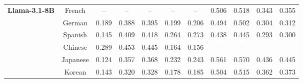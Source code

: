 \begin{table}[t]
\begin{tabular}{lcccccccccc}
    \midrule
    \multirow[c]{6}{*}{\textbf{Llama-3.1-8B}} & French   & --    & --    & --    & --    & --    & 0.506 & 0.518 & 0.343 & 0.355 \\
     & German   & 0.189 & 0.388 & 0.395 & 0.199 & 0.206 & 0.494 & 0.502 & 0.304 & 0.312 \\
     & Spanish  & 0.145 & 0.409 & 0.418 & 0.264 & 0.273 & 0.438 & 0.445 & 0.293 & 0.300 \\
     & \cellcolor{lightblue}Chinese & \cellcolor{lightblue}0.289 & \cellcolor{lightblue}0.453 & \cellcolor{lightblue}0.445 & \cellcolor{lightblue}0.164 & \cellcolor{lightblue}0.156 & \cellcolor{lightblue}--    & \cellcolor{lightblue}--    & \cellcolor{lightblue}--   & \cellcolor{lightblue}--    \\
     & \cellcolor{lightblue}Japanese& \cellcolor{lightblue}0.124 & \cellcolor{lightblue}0.357 & \cellcolor{lightblue}0.368 & \cellcolor{lightblue}0.232 & \cellcolor{lightblue}0.243 & \cellcolor{lightblue}0.561 & \cellcolor{lightblue}0.570 & \cellcolor{lightblue}0.436 & \cellcolor{lightblue}0.445 \\
     & \cellcolor{lightblue}Korean  & \cellcolor{lightblue}0.143 & \cellcolor{lightblue}0.320 & \cellcolor{lightblue}0.328 & \cellcolor{lightblue}0.178 & \cellcolor{lightblue}0.185 & \cellcolor{lightblue}0.504 & \cellcolor{lightblue}0.515 & \cellcolor{lightblue}0.362 & \cellcolor{lightblue}0.373 \\
    \bottomrule
  \end{tabular}\
  \vspace{-1em}
\end{table}
